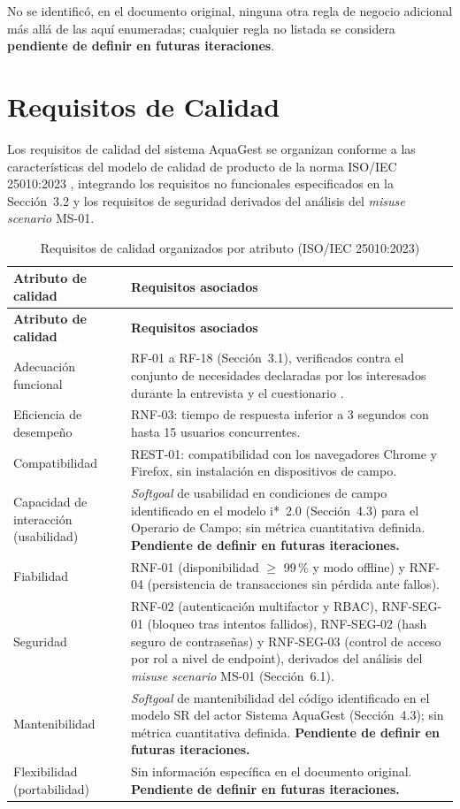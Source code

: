 \documentclass[12pt,a4paper]{article}
\begin{document}
No se identificó, en el documento original, ninguna otra regla de negocio
adicional más allá de las aquí enumeradas; cualquier regla no listada se
considera \textbf{pendiente de definir en futuras iteraciones}.

\section{Requisitos de Calidad}

Los requisitos de calidad del sistema AquaGest se organizan conforme a las
características del modelo de calidad de producto de la norma
ISO/IEC 25010:2023 \cite{ISO25010:2023}, integrando los requisitos no
funcionales especificados en la Sección~3.2 y los requisitos de seguridad
derivados del análisis del \textit{misuse scenario} MS-01.

\begin{longtable}{|p{3.4cm}|p{9.6cm}|}
\caption{Requisitos de calidad organizados por atributo (ISO/IEC 25010:2023)} \\
\hline
\textbf{Atributo de calidad} & \textbf{Requisitos asociados} \\
\hline
\endfirsthead
\hline
\textbf{Atributo de calidad} & \textbf{Requisitos asociados} \\
\hline
\endhead
Adecuación funcional & RF-01 a RF-18 (Sección~3.1), verificados contra el
conjunto de necesidades declaradas por los interesados durante la entrevista y
el cuestionario \cite{ISO25010:2023}. \\ \hline
Eficiencia de desempeño & RNF-03: tiempo de respuesta inferior a 3 segundos
con hasta 15 usuarios concurrentes. \\ \hline
Compatibilidad & REST-01: compatibilidad con los navegadores Chrome y
Firefox, sin instalación en dispositivos de campo. \\ \hline
Capacidad de interacción (usabilidad) & \textit{Softgoal} de usabilidad en
condiciones de campo identificado en el modelo i*~2.0 (Sección~4.3) para el
Operario de Campo; sin métrica cuantitativa definida. \textbf{Pendiente de
definir en futuras iteraciones.} \\ \hline
Fiabilidad & RNF-01 (disponibilidad $\geq$ 99\,\% y modo offline) y RNF-04
(persistencia de transacciones sin pérdida ante fallos). \\ \hline
Seguridad & RNF-02 (autenticación multifactor y RBAC), RNF-SEG-01 (bloqueo
tras intentos fallidos), RNF-SEG-02 (hash seguro de contraseñas) y RNF-SEG-03
(control de acceso por rol a nivel de endpoint), derivados del análisis del
\textit{misuse scenario} MS-01 (Sección~6.1). \\ \hline
Mantenibilidad & \textit{Softgoal} de mantenibilidad del código identificado en
el modelo SR del actor Sistema AquaGest (Sección~4.3); sin métrica
cuantitativa definida. \textbf{Pendiente de definir en futuras iteraciones.} \\ \hline
Flexibilidad (portabilidad) & Sin información específica en el documento
original. \textbf{Pendiente de definir en futuras iteraciones.} \\ \hline
\end{longtable}
\end{document}
